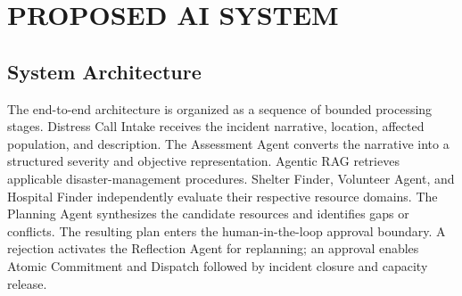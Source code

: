 \documentclass[conference]{IEEEtran}
\begin{document}
\section{PROPOSED AI SYSTEM}

\subsection{System Architecture}
The end-to-end architecture is organized as a sequence of bounded processing stages. Distress Call Intake receives the incident narrative, location, affected population, and description. The Assessment Agent converts the narrative into a structured severity and objective representation. Agentic RAG retrieves applicable disaster-management procedures. Shelter Finder, Volunteer Agent, and Hospital Finder independently evaluate their respective resource domains. The Planning Agent synthesizes the candidate resources and identifies gaps or conflicts. The resulting plan enters the human-in-the-loop approval boundary. A rejection activates the Reflection Agent for replanning; an approval enables Atomic Commitment and Dispatch followed by incident closure and capacity release.
\end{document}
